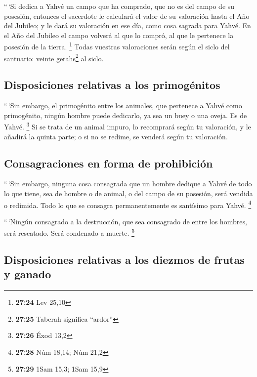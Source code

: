 \begin{paracol}{2}
 ``\,`Si dedica a Yahvé un campo que ha comprado, que no
es del campo de su posesión,  entonces el sacerdote le
calculará el valor de su valoración hasta el Año del Jubileo; y le dará
su valoración en ese día, como cosa sagrada para Yahvé. 
En el Año del Jubileo el campo volverá al que lo compró, al que le
pertenece la posesión de la tierra. \footnote{\textbf{27:24} Lev 25,10}
 Todas vuestras valoraciones serán según el siclo del
santuario: veinte gerahs\footnote{\textbf{27:25} Taberah significa
  ``ardor''} al siclo.

\hypertarget{disposiciones-relativas-a-los-primoguxe9nitos}{%
\subsection{Disposiciones relativas a los
primogénitos}\label{disposiciones-relativas-a-los-primoguxe9nitos}}

 ``\,`Sin embargo, el primogénito entre los animales, que
pertenece a Yahvé como primogénito, ningún hombre puede dedicarlo, ya
sea un buey o una oveja. Es de Yahvé. \footnote{\textbf{27:26} Éxod 13,2}
 Si se trata de un animal impuro, lo recomprará según tu
valoración, y le añadirá la quinta parte; o si no se redime, se venderá
según tu valoración.

\hypertarget{consagraciones-en-forma-de-prohibiciuxf3n}{%
\subsection{Consagraciones en forma de
prohibición}\label{consagraciones-en-forma-de-prohibiciuxf3n}}

 ``\,`Sin embargo, ninguna cosa consagrada que un hombre
dedique a Yahvé de todo lo que tiene, sea de hombre o de animal, o del
campo de su posesión, será vendida o redimida. Todo lo que se consagra
permanentemente es santísimo para Yahvé. \footnote{\textbf{27:28} Núm
  18,14; Núm 21,2}

 ``\,`Ningún consagrado a la destrucción, que sea
consagrado de entre los hombres, será rescatado. Será condenado a
muerte. \footnote{\textbf{27:29} 1Sam 15,3; 1Sam 15,9}

\hypertarget{disposiciones-relativas-a-los-diezmos-de-frutas-y-ganado}{%
\subsection{Disposiciones relativas a los diezmos de frutas y
ganado}\label{disposiciones-relativas-a-los-diezmos-de-frutas-y-ganado}}


\end{paracol}
